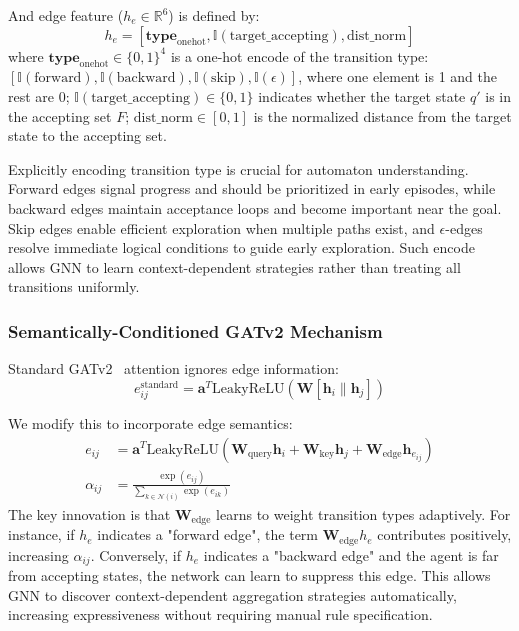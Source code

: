 \documentclass[journal]{IEEEtran}
\begin{document}
And edge feature ($h_e \in \mathbb{R}^6$) is defined by:
\begin{equation}
\label{eq:edge_features}
h_e = [\mathbf{type}_{\text{onehot}}, \mathbb{I}(\text{target\_accepting}), \text{dist\_norm}]
\end{equation}
where $\mathbf{type}_{\text{onehot}} \in \{0,1\}^4$ is a one-hot encode of the transition type: $[\mathbb{I}(\text{forward}), \mathbb{I}(\text{backward}), \mathbb{I}(\text{skip}), \mathbb{I}(\epsilon)]$, where one element is 1 and the rest are 0; $\mathbb{I}(\text{target\_accepting}) \in \{0,1\}$ indicates whether the target state $q'$ is in the accepting set $F$; $\text{dist\_norm} \in [0,1]$ is the normalized distance from the target state to the accepting set.

Explicitly encoding transition type is crucial for automaton understanding. Forward edges signal progress and should be prioritized in early episodes, while backward edges maintain acceptance loops and become important near the goal. Skip edges enable efficient exploration when multiple paths exist, and $\epsilon$-edges resolve immediate logical conditions to guide early exploration. Such encode allows GNN to learn context-dependent strategies rather than treating all transitions uniformly.

\subsubsection{Semantically-Conditioned GATv2 Mechanism}

Standard GATv2~\citep{Brody2022} attention ignores edge information:
\begin{equation}
\label{eq:gat_standard}
e_{ij}^{\text{standard}} = \mathbf{a}^T \text{LeakyReLU}(\mathbf{W} [\mathbf{h}_i \| \mathbf{h}_j])
\end{equation}

We modify this to incorporate edge semantics:
\begin{align}
\label{eq:gat_semantic}
e_{ij} &= \mathbf{a}^T \text{LeakyReLU}\left( \mathbf{W}_{\text{query}} \mathbf{h}_i + \mathbf{W}_{\text{key}} \mathbf{h}_j + \mathbf{W}_{\text{edge}} \mathbf{h}_{e_{ij}} \right) \\
\alpha_{ij} &= \frac{\exp(e_{ij})}{\sum_{k \in \mathcal{N}(i)} \exp(e_{ik})}
\end{align}
The key innovation is that $\mathbf{W}_{\text{edge}}$ learns to weight transition types adaptively. For instance, if $h_e$ indicates a "forward edge", the term $\mathbf{W}_{\text{edge}} h_e$ contributes positively, increasing $\alpha_{ij}$. Conversely, if $h_e$ indicates a "backward edge" and the agent is far from accepting states, the network can learn to suppress this edge. This allows GNN to discover context-dependent aggregation strategies automatically, increasing expressiveness without requiring manual rule specification.
\end{document}

